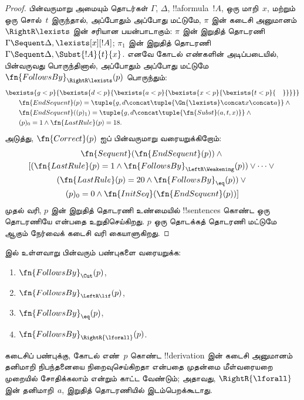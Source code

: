 \documentclass[../../../include/open-logic-section]{subfiles}
\begin{document}
\begin{proof}
பின்வருமாறு அமையும் தொடர்கள் $\Gamma$, $\Delta$, !!a{formula}~$!A$,
ஒரு மாறி~$x$, மற்றும் ஒரு சொல்~$t$ இருந்தால், அப்போதும் அப்போது மட்டுமே,
$\pi$ இன் கடைசி அனுமானம் $\RightR\lexists$ இன் சரியான பயன்பாடாகும்:
$\pi$ இன் இறுதித் தொடரணி $\Gamma \Sequent \Delta, \lexists[x][!A]$;
$\pi_1$ இன் இறுதித் தொடரணி $\Gamma \Sequent \Delta,
\Subst{!A}{t}{x}$. எனவே கோடல் எண்களின் அடிப்படையில், பின்வருவது
பொருந்தினால், அப்போதும் அப்போது மட்டுமே
$\fn{FollowsBy}_{\RightR\lexists}(p)$ பொருந்தும்:
\begin{align*}
  & \bexists{g<p}{\bexists{d<p}{\bexists{a<p}{\bexists{x<p}{\bexists{t<p}{\quad}}}}}\\
  & \qquad \fn{EndSequent}(p) =
  \tuple{
    g,
    d \concat \tuple{\Gn{\lexists} \concat x \concat a}
  } \land {}\\
  & \qquad \fn{EndSequent}((p)_1) =
  \tuple{
    g,
    d \concat \tuple{\fn{Subst}(a, t, x)}
  } \land {}\\
  & \qquad (p)_0 = 1 \land \fn{LastRule}(p) = 18.
\end{align*}
அடுத்து, $\fn{Correct}(p)$ ஐப் பின்வருமாறு வரையறுக்கிறோம்:
\begin{multline*}
  \fn{Sequent}(\fn{EndSequent}(p)) \land {}\\
  [(\fn{LastRule}(p) = 1 \land
  \fn{FollowsBy}_{\LeftR\Weakening}(p)) \lor \dots \lor {}\\
  (\fn{LastRule}(p) = 20 \land \fn{FollowsBy}_{\eq}(p)) \lor {}\\
  (p)_0 = 0 \land \fn{InitSeq}(\fn{EndSequent}(p))]
\end{multline*}
முதல் வரி, $p$ இன் இறுதித் தொடரணி உண்மையில் !!{sentence}s கொண்ட ஒரு
தொடரணியே என்பதை உறுதிசெய்கிறது. $p$ ஒரு தொடக்கத் தொடரணி மட்டுமே ஆகும்
நேர்வைக் கடைசி வரி கையாளுகிறது.
\end{proof}

\begin{prob}
   இல் உள்ளவாறு பின்வரும் பண்புகளை
  வரையறுக்க:
  \begin{enumerate}
  \item $\fn{FollowsBy}_{\Cut}(p)$,
  \item $\fn{FollowsBy}_{\LeftR\lif}(p)$,
  \item $\fn{FollowsBy}_{\eq}(p)$,
  \item $\fn{FollowsBy}_{\RightR{\lforall}}(p)$.
  \end{enumerate}
  கடைசிப் பண்புக்கு, கோடல் எண்~$p$ கொண்ட !!{derivation} இன் கடைசி அனுமானம்
  தனிமாறி நிபந்தனையை நிறைவுசெய்கிறதா என்பதை முதன்மை மீள்வரையறை முறையில்
  சோதிக்கலாம் என்றும் காட்ட வேண்டும்; அதாவது, $\RightR{\lforall}$ இன்
  தனிமாறி~$a$, இறுதித் தொடரணியில் இடம்பெறக்கூடாது.
  \end{prob}
\end{document}
